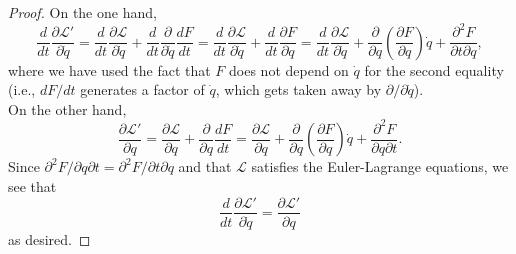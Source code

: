\documentclass{article}
\theoremstyle{definition}
\newcommand{\p}{\partial}
\newcommand{\lag}{\mathcal{L}}
\newcommand{\f}[2]{\frac{#1}{#2}}
\newcommand{\lp}{\left(}
\newcommand{\rp}{\right)}
\begin{document}
\begin{proof}
	On the one hand, 
	\begin{equation*}
	\f{d}{dt} \f{\p \lag'}{\p \dot{q}}  =
	\f{d}{dt} \f{\p \lag}{\p \dot{q}}  + \f{d}{dt} \f{\p }{\p \dot{q}} \f{d F}{d t} =  \f{d}{dt} \f{\p \lag}{\p \dot{q}}  
	+ \f{d}{dt}\f{\p F}{\p q} 
	= \f{d}{dt} \f{\p \lag}{\p \dot{q}} 
	+ \f{\p}{\p q}\lp \f{\p F}{\p q} \rp \dot{q}
	+ \f{\p^2 F}{\p t \p q},
	\end{equation*}
	where we have used the fact that $F$ does not depend on $\dot{q}$ for the second equality (i.e., $d F/d t$ generates a factor of $\dot{q}$, which gets taken away by $\p/\p \dot{q}$). \\
	
	On the other hand,
	\begin{equation*}
	\f{\p \lag'}{\p q}  = \f{\p \lag }{\p q} +  \f{\p}{\p q} \f{dF}{dt} = \f{\p \lag }{\p q} +  \f{\p}{\p q} \lp \f{\p F}{\p q}\rp\dot{q} + \f{\p^2 F}{\p q\p t}.
	\end{equation*}
	Since $\p^2 F/\p q\p t = \p^2 F/\p t \p q$ and that $\lag$ satisfies the Euler-Lagrange equations, we see that 
	\begin{equation*}
	\f{d}{dt}\f{\p \lag'}{\p \dot{q}} = \f{\p \lag'}{\p q}
	\end{equation*}
	as desired.
\end{proof} 

	
	
	
	
	
	
	
	
	
	
	
	
	
	
	
\end{document}
